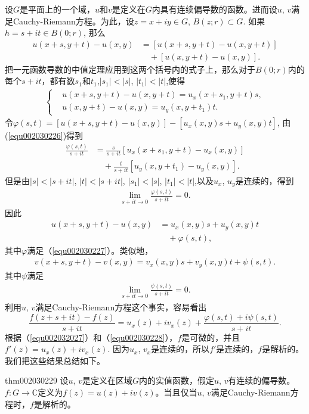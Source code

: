 设$G$是平面上的一个域，$u$和$v$是定义在$G$内具有连续偏导数的函数。进而设$u$, $v$满足Cauchy-Riemann方程。为此，设$z = x + iy \in G$, $B(z;r) \subset G$. 如果$h = s + it \in B(0; r)$, 那么
\[
\begin{aligned}
u(x+s, y+t) - u(x, y) &= [u(x+s, y+t) - u(x, y + t)]\\
&\quad + [u(x, y + t) - u(x, y)].
\end{aligned}
\]
把一元函数导数的中值定理应用到这两个括号内的式子上，那么对于$B(0; r)$内的每个$s + it$，都有数$s_1$和$t_1$,$|s_1| < |s|$, $|t_1| < |t|$,使得
\begin{gather}\label{equ002030226}
\left\{
\begin{aligned}
&u(x+s, y+t) - u(x, y+t) = u_x(x+s_1, y+ t)s,\\
&u(x, y+t) - u(x, y) = u_y(x, y + t_1)t.
\end{aligned}
\right.
\end{gather}
令$\varphi(s, t) = [u(x+s, y+t) - u(x, y)] - [u_x(x, y)s +u_y(x, y)t]$, 由(\ref{equ002030226})得到
\[
\begin{aligned}
\frac{\varphi(s, t)}{s + it} &= \frac{s}{s + it}[u_x(x+s_1, y + t) - u_x(x, y)]\\
&\quad + \frac{t}{s+it}[u_y(x, y+t_1) - u_y(x, y)].
\end{aligned}
\]
但是由$|s| < |s + it|$, $|t| < |s + it|$, $|s_1| < |s|$, $|t_1| < |t|$,以及$u_x$, $u_y$是连续的，得到
\begin{gather}\label{equ002030227}
\lim_{s + it \to 0}{\frac{\varphi(s, t)}{s + it}} = 0.
\end{gather}
因此
\[
\begin{aligned}
u(x+s, y+t) - u(x, y) &= u_x(x, y)s + u_y(x, y)t \\
&\quad + \varphi(s, t),
\end{aligned}
\]
其中$\varphi$满足（\ref{equ002030227}）。类似地，
\[
\begin{aligned}
v(x+s, y+t) - v(x, y) = v_x(x, y)s + v_y(x, y)t + \psi(s, t).
\end{aligned}
\]
其中$\psi$满足
\begin{gather}\label{002030228}
\lim_{s +it \to 0}{\frac{\psi(s, t)}{s+it}} = 0.
\end{gather}
利用$u$, $v$满足Cauchy-Riemann方程这个事实，容易看出
\[
\frac{f(z + s + it) - f(z)}{s+it} = u_x(z) + iv_x(z) + \frac{\varphi(s, t) + i\psi(s, t)}{s+it}.
\]
根据（\ref{equ002032027}）和（\ref{equ002030228}），$f$是可微的，并且$f'(z) = u_x(z) + iv_x(z)$. 因为$u_x$, $v_x$是连续的，所以$f'$是连续的，$f$是解析的。我们把这些结果总结如下。
\begin{theorem}{}{thm002030229}
设$u$, $v$是定义在区域$G$内的实值函数，假定$u$, $v$有连续的偏导数。$f: G \to \mathbb{C}$定义为$f(z) = u(z) + iv(z)$。当且仅当$u$, $v$满足Cauchy-Riemann方程时，$f$是解析的。
\end{theorem}

